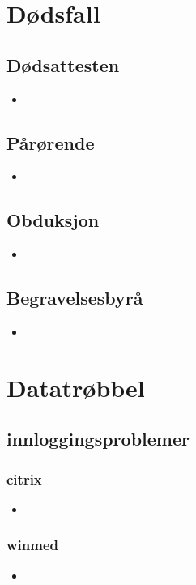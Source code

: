 \newpage
\chapter{Dødsfall}
	\section{Dødsattesten}
		\begin{itemize}
			\item
		\end{itemize}
	\section{Pårørende}
		\begin{itemize}
			\item
		\end{itemize}
	\section{Obduksjon}
		\begin{itemize}
			\item
		\end{itemize}
	\section{Begravelsesbyrå}
		\begin{itemize}
			\item
		\end{itemize}

\newpage
\chapter{Datatrøbbel}
	\section{innloggingsproblemer}
		\subsection{citrix}
			\begin{itemize}
				\item
			\end{itemize}
		\subsection{winmed}
			\begin{itemize}
				\item
			\end{itemize}
